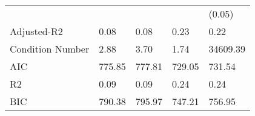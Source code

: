 \begin{table}
\begin{center}
\begin{tabular}{lllll}
                                               &         &         &          & (0.05)    \\
Adjusted-R2                                    & 0.08    & 0.08    & 0.23     & 0.22      \\
Condition Number                               & 2.88    & 3.70    & 1.74     & 34609.39  \\
AIC                                            & 775.85  & 777.81  & 729.05   & 731.54    \\
R2                                             & 0.09    & 0.09    & 0.24     & 0.24      \\
BIC                                            & 790.38  & 795.97  & 747.21   & 756.95    \\
\hline
\end{tabular}
\end{center}
\end{table}